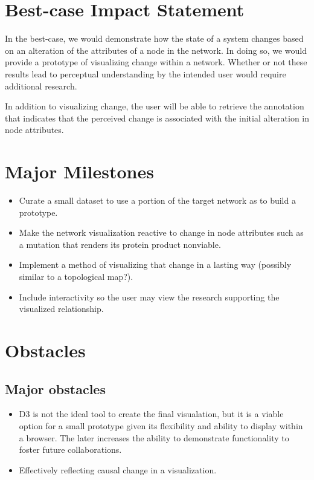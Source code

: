 \documentclass{proc}	%
\begin{document}
\section{Best-case Impact Statement}
In the best-case, we would demonstrate how the state of a system changes based on an alteration of the attributes of a node in the network. In doing so, we would provide a prototype of visualizing change within a network. Whether or not these results lead to perceptual understanding by the intended user would require additional research.

In addition to visualizing change, the user will be able to retrieve the annotation that indicates that the perceived change is associated with the initial alteration in node attributes.
\section{Major Milestones}
\begin{itemize}
  \item Curate a small dataset to use a portion of the target network as to build a prototype.
  \item Make the network visualization reactive to change in node attributes such as a mutation that renders its protein product nonviable.
  \item Implement a method of visualizing that change in a lasting way (possibly similar to a topological map?).
  \item Include interactivity so the user may view the research supporting the visualized relationship.
\end{itemize}
\section{Obstacles}
\subsection{Major obstacles} %
\begin{itemize}
  \item D3 is not the ideal tool to create the final visualation, but it is a viable option for a small prototype given its flexibility and ability to display within a browser. The later increases the ability to demonstrate functionality to foster future collaborations.
  \item Effectively reflecting causal change in a visualization.
\end{itemize}
\end{document}
